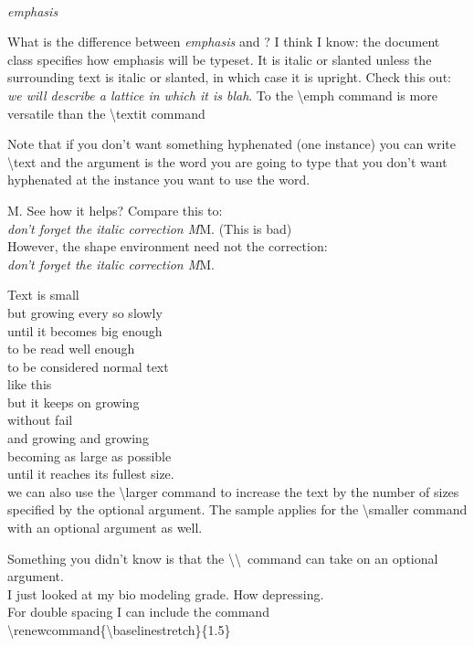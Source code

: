 \documentclass[12pt,draft]{amsart} %
\begin{document}
 \\
{\itshape emphasis}

What is the difference between \emph{emphasis} and ? I think I know: the document class specifies how emphasis will be typeset. It is italic or slanted unless the surrounding text is italic or slanted, in which case it is upright. Check this out: {\itshape we will describe a \emph{lattice} in which it is blah}. To the \textbackslash emph command is more versatile than the \textbackslash textit command

Note that if you don't want something hyphenated (one instance) you can write \textbackslash text and the argument is the word you are going to type that you don't want hyphenated at the instance you want to use the word. 

M. See how it helps? Compare this to: \\
{\em don't forget the italic correction M}M. (This is bad)\\
However, the shape environment need not the correction: \\
\textit{don't forget the italic correction M}M. 


\noindent \Tiny Text is small \\
\tiny but growing every so slowly \\
\SMALL until it becomes big enough \\
\Small to be read well enough \\
\small to be considered normal text \\
\normalsize like this \\
\large but it keeps on growing \\
\Large without fail \\
\LARGE and growing and growing \\
\huge becoming as large as possible \\
\Huge until it reaches its fullest size. \\

\normalsize
we can also use the \larger[1] \textbackslash larger \normalsize command to increase the text by the number of sizes specified by the optional argument. The sample applies for the \smaller[1] \textbackslash smaller \normalsize command with an optional argument as well. 

Something you didn't know is that the \textbackslash \textbackslash \ command can take on an optional argument. \\[12pt]
I just looked at my bio modeling grade. How depressing. \\
For double spacing I can include the command\\ \textbackslash renewcommand\{\textbackslash baselinestretch\}\{1.5\} \\[12pt]
\end{document}
